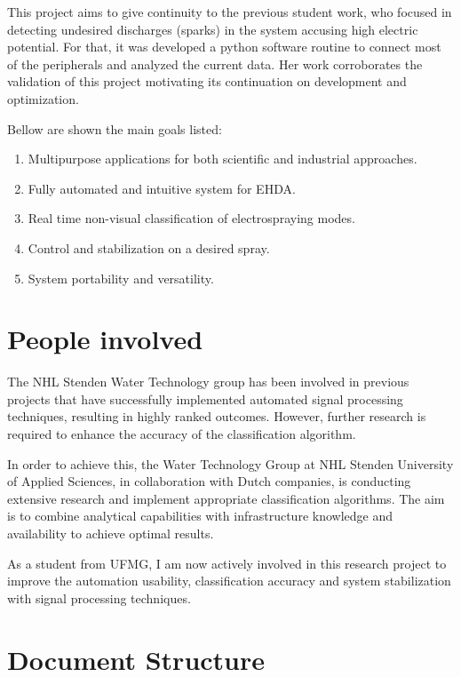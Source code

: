 This project aims to give continuity to the previous student work\cite{Monica}, who focused in detecting undesired discharges (sparks) in the system accusing high electric potential. 
For that, it was developed a python software routine to connect most of the peripherals and analyzed the current data.
Her work corroborates the validation of this project motivating its continuation on development and optimization.

Bellow are shown the main goals listed:

\begin{enumerate}[]
\item Multipurpose applications for both scientific and industrial approaches.
\item Fully automated and intuitive system for EHDA.
\item Real time non-visual classification of electrospraying modes.
\item Control and stabilization on a desired spray. 
\item System portability and versatility.
\end{enumerate}


\section{People involved}
\label{sec:companies}

The NHL Stenden Water Technology group has been involved in previous projects that have successfully implemented automated signal processing techniques, resulting in highly ranked outcomes. 
However, further research is required to enhance the accuracy of the classification algorithm. 

In order to achieve this, the Water Technology Group at NHL Stenden University of Applied Sciences, in collaboration with Dutch companies, is conducting extensive research and implement appropriate classification algorithms. The aim is to combine analytical capabilities with infrastructure knowledge and availability to achieve optimal results.

As a student from UFMG, I am now actively involved in this research project to improve the automation usability, classification accuracy and system stabilization with signal processing techniques.

\section{Document Structure}
\label{sec:doc_struct}

